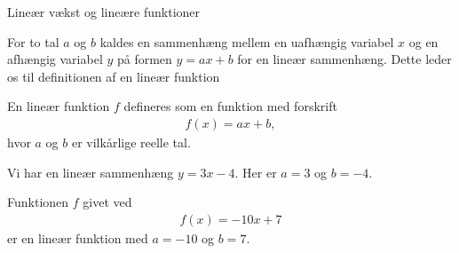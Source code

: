\documentclass[12pt]{article}
\begin{document}


\begin{center}
\Huge
Lineær vækst og lineære funktioner
\end{center}
For to tal $a$ og $b$ kaldes en sammenhæng mellem en uafhængig variabel $x$ og en afhængig variabel $y$ på formen $y = ax + b$ for en lineær sammenhæng. Dette leder os til definitionen af en lineær funktion
\begin{defn}
En lineær funktion $f$ defineres som en funktion med forskrift
\begin{align*}
f(x) = ax + b,
\end{align*}
hvor $a$ og $b$ er vilkårlige reelle tal. 
\end{defn}

\begin{exa}
Vi har en lineær sammenhæng $y = 3x-4$. Her er $a = 3$ og $b = -4$. 
\end{exa}
\begin{exa}
Funktionen $f$ givet ved
\begin{align*}
f(x) = -10x+7
\end{align*}
er en lineær funktion med $a= -10$ og $b = 7$.
\end{exa}
\end{document}
